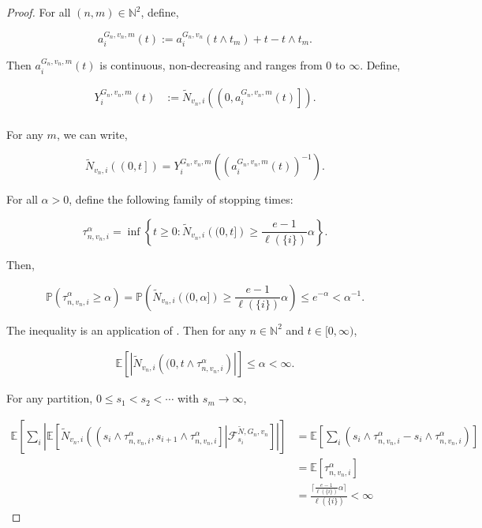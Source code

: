 \documentclass[12pt]{article}
\newcommand{\mb}{\mathbb}
\newcommand{\mc}{\mathcal}
\newcommand{\ra}{\rightarrow}
\newcommand{\ind}{\hspace{24pt}}
\newcommand{\pr}{\mb{P}}							%
\newcommand{\ex}[1]{\mb{E}\left[#1\right]}			%
\newcommand{\defeq}{:=}								%
\newcommand{\poiss}{N}								%
\newcommand{\Sm}{\ell}								%
\newcommand{\F}{\mc{F}}								%
\newcommand{\poissv}[1]{_{#1}}						%
\newcommand{\tme}[1]{(#1)}							%
\newcommand{\stpara}[1]{_{#1}}						%
\newcommand{\tpara}[1]{_{#1}}						%
\newcommand{\gvpara}[2]{^{#1,#2}}					%
\newcommand{\compen}{a}								%
\newcommand{\binver}[1]{(#1)^{-1}}					%
\newcommand{\Xg}{Y}									%
\newcommand{\alt}[1]{\tilde{#1}}					%
\newcommand{\gvjpara}[3]{^{#1,#2,#3}}				%
\begin{document}
\begin{proof}
\ind For all \((n,m)\in \mb{N}^2\), define,

\[\compen\gvjpara{G_n}{v_n}{m}\stpara{i}\tme{t} \defeq \compen\gvpara{G_n}{v_n}\stpara{i}\tme{t\wedge t_m} + t - t\wedge t_m.\]

Then \(\compen\gvjpara{G_n}{v_n}{m}\stpara{i}\tme{t}\) is continuous, non-decreasing and ranges from 0 to \(\infty\). Define,

\begin{align*}
\Xg\gvjpara{G_n}{v_n}{m}\stpara{i}\tme{t} &\defeq \alt{\poiss}\poissv{v_n,i}\left(\left(0,\compen\gvjpara{G_n}{v_n}{m}\stpara{i}\tme{t}\right]\right).\\
\end{align*}

For any \(m\), we can write,

\[\alt{\poiss}\poissv{v_n,i}\left(\left(0,t\right]\right) = \Xg\gvjpara{G_n}{v_n}{m}\stpara{i}\tme{\binver{\compen\gvjpara{G_n}{v_n}{m}\stpara{i}\tme{t}}}.\]

For all \(\alpha > 0\), define the following family of stopping times: 

\[\tau_{n,v_n,i}^\alpha = \inf\left\{t \geq 0: \alt{\poiss}\poissv{v_n,i}\left((0,t]\right) \geq \frac{e-1}{\Sm(\{i\})}\alpha\right\}.\]

Then,

\[\pr\left(\tau_{n,v_n,i}^\alpha \geq \alpha\right) = \pr\left(\alt{\poiss}\poissv{v_n,i}\left((0,\alpha]\right) \geq \frac{e-1}{\Sm(\{i\})}\alpha\right) \leq e^{-\alpha} < \alpha^{-1}.\]

The inequality is an application of \cite[Lemma 5.13(c)]{Bar17}. Then for any \(n\in\mb{N}^2\) and \(t \in [0,\infty)\),

\begin{align*}
\ex{\left|\alt{\poiss}\poissv{v_n,i}\left((0,t\wedge\tau_{n,v_n,i}^\alpha\right)\right|} \leq \alpha < \infty.
\end{align*}

For any partition, \(0\leq s_1 < s_2 < \cdots\) with \(s_m \ra \infty\), 

\begin{align*}
\ex{\sum_{i}\left|\ex{\alt{\poiss}\poissv{v_n,i}\left(\left(s_i\wedge\tau_{n,v_n,i}^\alpha,s_{i+1}\wedge\tau_{n,v_n,i}^\alpha\right]\right|\F\tpara{s_i}^{\alt{\poiss},G_n,v_n}}\right|} &=\ex{\sum_{i}\left(s_i\wedge\tau_{n,v_n,i}^\alpha - s_i\wedge\tau_{n,v_n,i}^\alpha\right)}\\
&= \ex{\tau_{n,v_n,i}^\alpha}\\
&= \frac{\lceil \frac{e-1}{\Sm(\{i\})}\alpha\rceil}{\Sm(\{i\})} < \infty
\end{align*}


\end{proof}
\end{document}
